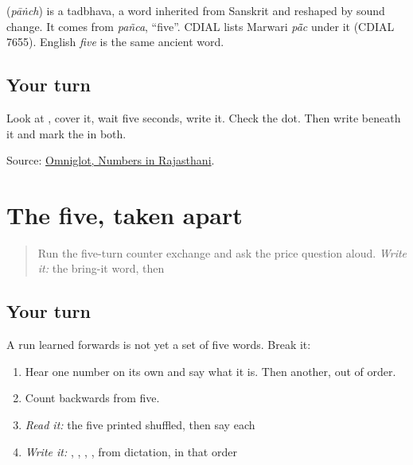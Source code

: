 \begin{cousinweb}
\textbf{} (\emph{pāṅch}) is a tadbhava, a word inherited from Sanskrit and reshaped by sound change. It comes from \emph{pañca}, \textquotedblleft{}five\textquotedblright{}. CDIAL lists Marwari \emph{pā̃c} under it (CDIAL 7655). English \emph{five} is the same ancient word.
\end{cousinweb}

\subsection*{Your turn}
Look at \textbf{}, cover it, wait five seconds, write it. Check the dot. Then write \textbf{} beneath it and mark the \textbf{} in both.

\begin{tcolorbox}[breakable,colback=teal!4,colframe=teal!35!black,title={Before you move on}]
Source: \href{https://www.omniglot.com/language/numbers/rajasthani.htm}{Omniglot, Numbers in Rajasthani}.
\end{tcolorbox}
\section[Practice]{The five, taken apart}

\label{lesson:MW-R32-count-recall}



\begin{quote}
Run the five-turn counter exchange and ask the price question aloud. \emph{Write it:} the bring-it word, then \textbf{}
\end{quote}

\subsection*{Your turn}
A run learned forwards is not yet a set of five words. Break it:

\begin{enumerate}
\raggedright
  \item Hear one number on its own and say what it is. Then another, out of order.
  \item Count backwards from five.
  \item \emph{Read it:} the five printed shuffled, then say each
  \item \emph{Write it:} \textbf{}, \textbf{}, \textbf{}, \textbf{}, \textbf{} from dictation, in that order
\end{enumerate}

